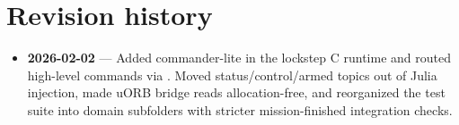 \section*{Revision history}

\begin{itemize}[leftmargin=*,itemsep=2pt]
  \item \textbf{2026-02-02} --- Added commander-lite in the lockstep C runtime and routed
  high-level commands via . Moved status/control/armed topics out of Julia
  injection, made uORB bridge reads allocation-free, and reorganized the test suite into
  domain subfolders with stricter mission-finished integration checks.
\end{itemize}
